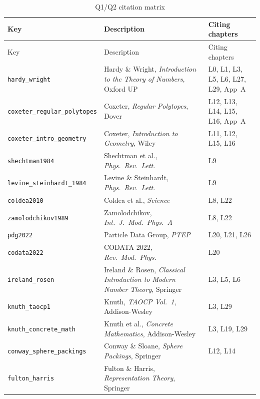 \begin{longtable}{lp{4cm}p{6cm}}
\toprule
Key & Description & Citing chapters \\
\midrule
\endfirsthead
\toprule
Key & Description & Citing chapters \\
\midrule
\endhead
\bottomrule
\endfoot
\bottomrule
\caption{Q1/Q2 citation matrix}
\endlastfoot
\texttt{hardy\_wright} &
  Hardy \& Wright, \emph{Introduction to the Theory of Numbers},
  Oxford UP \cite{hardy_wright} &
  L0, L1, L3, L5, L6, L27, L29, App~A \\
\texttt{coxeter\_regular\_polytopes} &
  Coxeter, \emph{Regular Polytopes}, Dover
  \cite{coxeter_regular_polytopes} &
  L12, L13, L14, L15, L16, App~A \\
\texttt{coxeter\_intro\_geometry} &
  Coxeter, \emph{Introduction to Geometry}, Wiley
  \cite{coxeter_intro_geometry} &
  L11, L12, L15, L16 \\
\texttt{shechtman1984} &
  Shechtman et al., \emph{Phys.\ Rev.\ Lett.}
  \cite{shechtman1984} &
  L9 \\
\texttt{levine\_steinhardt\_1984} &
  Levine \& Steinhardt, \emph{Phys.\ Rev.\ Lett.}
  \cite{levine_steinhardt_1984} &
  L9 \\
\texttt{coldea2010} &
  Coldea et al., \emph{Science} \cite{coldea2010} &
  L8, L22 \\
\texttt{zamolodchikov1989} &
  Zamolodchikov, \emph{Int.\ J.\ Mod.\ Phys.\ A}
  \cite{zamolodchikov1989} &
  L8, L22 \\
\texttt{pdg2022} &
  Particle Data Group, \emph{PTEP} \cite{pdg2022} &
  L20, L21, L26 \\
\texttt{codata2022} &
  CODATA 2022, \emph{Rev.\ Mod.\ Phys.} \cite{codata2022} &
  L20 \\
\texttt{ireland\_rosen} &
  Ireland \& Rosen, \emph{Classical Introduction to Modern
  Number Theory}, Springer \cite{ireland_rosen} &
  L3, L5, L6 \\
\texttt{knuth\_taocp1} &
  Knuth, \emph{TAOCP Vol.\ 1}, Addison-Wesley
  \cite{knuth_taocp1} &
  L3, L29 \\
\texttt{knuth\_concrete\_math} &
  Knuth et al., \emph{Concrete Mathematics},
  Addison-Wesley \cite{knuth_concrete_math} &
  L3, L19, L29 \\
\texttt{conway\_sphere\_packings} &
  Conway \& Sloane, \emph{Sphere Packings}, Springer
  \cite{conway_sphere_packings} &
  L12, L14 \\
\texttt{fulton\_harris} &
  Fulton \& Harris, \emph{Representation Theory}, Springer
  \cite{fulton_harris} &

\end{longtable}
